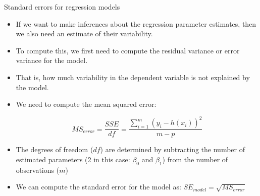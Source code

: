 \documentclass[handout]{beamer}
\begin{document}
\begin{frame}{Standard errors for regression models}
\scriptsize{
\begin{itemize}
 \item If we want to make inferences about the regression parameter estimates, then we also need an estimate of their variability. \cite{poldrack2019statistical}
 \item To compute this, we first need to compute the residual variance or error variance for the model.
 \item That is, how much variability in the dependent variable is not explained by the model. 
 \item We need to compute the mean squared error:
 
 \begin{displaymath}
  MS_{error} = \frac{SSE}{df} = \frac{\sum_{i=1}^{m} (y_i-h(x_i))^2}{m-p}
 \end{displaymath}

 \item The degrees of freedom ($df$) are determined by subtracting the number of estimated parameters (2 in this case: $\beta_0$ and $\beta_1$) from the number of observations ($m$)

 \item  We can compute the standard error for the model as: $SE_{model} = \sqrt{MS_{error}}$
 


 
\end{itemize}


}
 
\end{frame}
\end{document}
